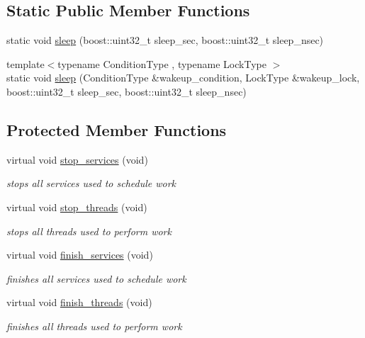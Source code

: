 \subsection*{Static Public Member Functions}
\begin{DoxyCompactItemize}
\item 
static void \hyperlink{classpion_1_1scheduler_aeaa9a398167fdab0fa0f5a1e16d0a279}{sleep} (boost\-::uint32\-\_\-t sleep\-\_\-sec, boost\-::uint32\-\_\-t sleep\-\_\-nsec)
\item 
{\footnotesize template$<$typename Condition\-Type , typename Lock\-Type $>$ }\\static void \hyperlink{classpion_1_1scheduler_af4a67a6731a94a59cf60f9916debf026}{sleep} (Condition\-Type \&wakeup\-\_\-condition, Lock\-Type \&wakeup\-\_\-lock, boost\-::uint32\-\_\-t sleep\-\_\-sec, boost\-::uint32\-\_\-t sleep\-\_\-nsec)
\end{DoxyCompactItemize}
\subsection*{Protected Member Functions}
\begin{DoxyCompactItemize}
\item 
virtual void \hyperlink{classpion_1_1scheduler_a62b59f0561bd527d78768fd3a5ceeb36}{stop\-\_\-services} (void)
\begin{DoxyCompactList}\small\item\em stops all services used to schedule work \end{DoxyCompactList}\item 
virtual void \hyperlink{classpion_1_1scheduler_abd7b1239bb9cf5a6ca1492341adfc4db}{stop\-\_\-threads} (void)
\begin{DoxyCompactList}\small\item\em stops all threads used to perform work \end{DoxyCompactList}\item 
virtual void \hyperlink{classpion_1_1scheduler_a64dbc267db8e1481f80ba6d42bbb24ea}{finish\-\_\-services} (void)
\begin{DoxyCompactList}\small\item\em finishes all services used to schedule work \end{DoxyCompactList}\item 
virtual void \hyperlink{classpion_1_1scheduler_a6436e075a8c23734e55329f4286b5509}{finish\-\_\-threads} (void)
\begin{DoxyCompactList}\small\item\em finishes all threads used to perform work \end{DoxyCompactList}\end{DoxyCompactItemize}

